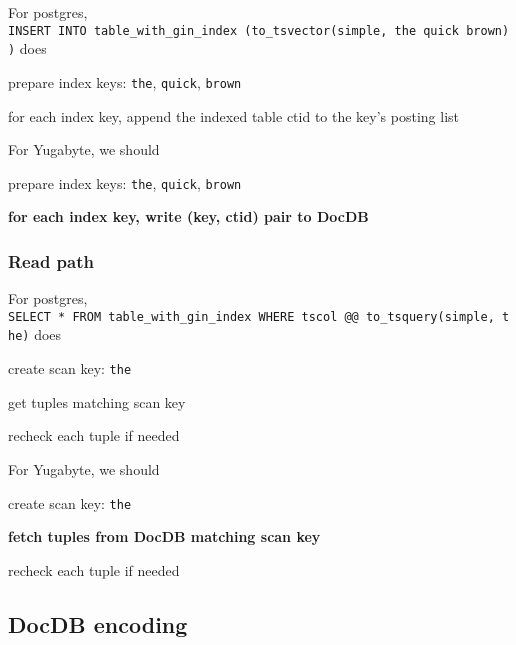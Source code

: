 \documentclass[11pt]{article}
\begin{document}
For postgres,
\texttt{INSERT\ INTO\ table\_with\_gin\_index\ (to\_tsvector(\textquotesingle{}simple\textquotesingle{},\ \textquotesingle{}the\ quick\ brown\textquotesingle{}))}
does

\begin{nparts}
\item
  prepare index keys: \texttt{the}, \texttt{quick}, \texttt{brown}
\item
  for each index key, append the indexed table ctid to the key's posting
  list
\end{nparts}

For Yugabyte, we should

\begin{nparts}
\item
  prepare index keys: \texttt{the}, \texttt{quick}, \texttt{brown}
\item
  \textbf{for each index key, write (key, ctid) pair to DocDB}
\end{nparts}

\hypertarget{read-path}{%
\subsubsection{Read path}\label{read-path}}

For postgres,
\texttt{SELECT\ *\ FROM\ table\_with\_gin\_index\ WHERE\ tscol\ @@\ to\_tsquery(\textquotesingle{}simple\textquotesingle{},\ \textquotesingle{}the\textquotesingle{})}
does

\begin{nparts}
\item
  create scan key: \texttt{the}
\item
  get tuples matching scan key
\item
  recheck each tuple if needed
\end{nparts}

For Yugabyte, we should

\begin{nparts}
\item
  create scan key: \texttt{the}
\item
  \textbf{fetch tuples from DocDB matching scan key}
\item
  recheck each tuple if needed
\end{nparts}

\hypertarget{docdb-encoding}{%
\subsection{DocDB encoding}\label{docdb-encoding}}
\end{document}
